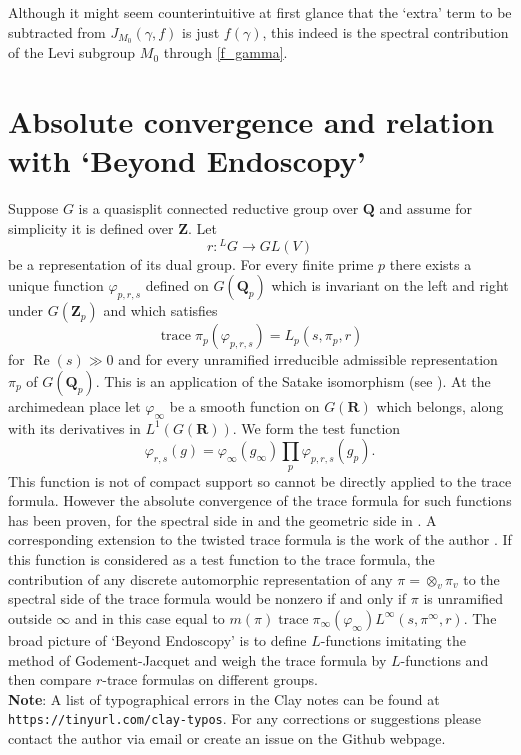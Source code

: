 \documentclass{ims9x6}
\def\Q{\mathbf Q}
\def\R{\mathbf R}
\def\Z{\mathbf Z}
\def\Lone{L^1}
\def\Re{\operatorname{Re}}
\def\trace{\operatorname{trace}}
\begin{document}
Although it might seem counterintuitive at first glance that the `extra' term to be subtracted from $J_{M_0}(\gamma, f)$ is just $f(\gamma)$, this indeed is the spectral contribution of the Levi subgroup $M_0$ through \cref{f_gamma}.

\section{Absolute convergence and relation with `Beyond Endoscopy'}

Suppose $G$ is a quasisplit connected reductive group over $\Q$ and assume for simplicity it is defined over $\Z$. Let
\[ r : {}^LG \to GL(V) \]
be a representation of its dual group. For every finite prime $p$ there exists a unique function $\varphi_{p, r, s}$ defined on $G(\Q_p)$ which is invariant on the left and right under $G(\Z_p)$ and which satisfies
\[ \trace \pi_p(\varphi_{p, r, s}) = L_p(s, \pi_p, r) \]
for $\Re(s) \gg 0$ and for every unramified irreducible admissible representation $\pi_p$ of $G(\Q_p)$. This is an application of the Satake isomorphism (see \cite{MR3220933}). At the archimedean place let $\varphi_\infty$ be a smooth function on $G(\R)$ which belongs, along with its derivatives in $\Lone(G(\R))$. We form the test function
\[ \varphi_{r, s}(g) = \varphi_\infty(g_\infty) \displaystyle\prod_p \varphi_{p, r, s}(g_p). \]
This function is not of compact support so cannot be directly applied to the trace formula. However the absolute convergence of the trace formula for such functions has been proven, for the spectral side in \cite{FLM} and the geometric side in \cite{FL16}. A corresponding extension to the twisted trace formula is the work of the author \cite{Par19}. If this function is considered as a test function to the trace formula, the contribution of any discrete automorphic representation of any $\pi = \otimes_v \pi_v$ to the spectral side of the trace formula would be nonzero if and only if $\pi$ is unramified outside $\infty$ and in this case equal to $m(\pi) \trace \pi_\infty(\varphi_\infty) L^\infty(s, \pi^\infty, r)$. The broad picture of `Beyond Endoscopy' is to define $L$-functions imitating the method of Godement-Jacquet and weigh the trace formula by $L$-functions and then compare $r$-trace formulas on different groups. \\

\textbf{Note}: A list of typographical errors in the Clay notes can be found at \texttt{https://tinyurl.com/clay-typos}. For any corrections or suggestions please contact the author via email or create an issue on the Github webpage. 
\end{document}
